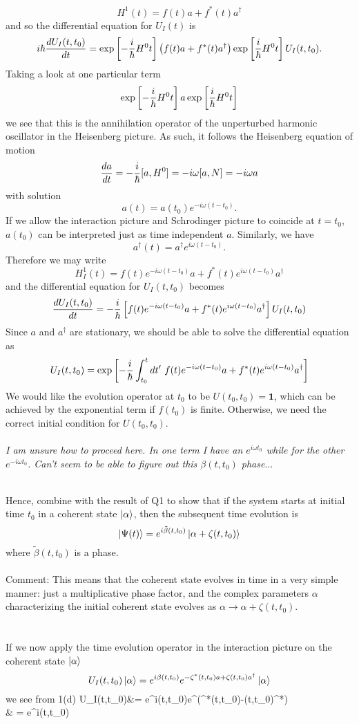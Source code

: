 \documentclass[10pt,letterpaper]{article}
\begin{document}
	\[
		H^1(t) = f(t)a+f^*(t)a^\dag
	\] 
	and so the differential equation for $U_I(t)$ is
	\[
		i\h\diff[U_I(t,t_0)]{t}  = \exp\blr{-\frac{i}{\h}H^0 t}\plr{f(t)a+f^*(t)a^\dag }\exp\blr{\frac{i}{\h}H^0t} U_I(t,t_0).
	\]
	Taking a look at one particular term
	\[
		 \exp\blr{-\frac{i}{\h}H^0t}a\exp\blr{\frac{i}{\h}H^0t} 
	\]
	we see that this is the annihilation operator of the unperturbed harmonic oscillator in the Heisenberg picture. As
	such, it follows the Heisenberg equation of motion
	\[
		\diff[a]{t} = -\frac{i}{\h}[a,H^0] = -i\omega[a,N] = -i\omega a
	\]
	with solution
	\[
		a(t) = a(t_0)e^{-i\omega (t-t_0)}.
	\]
	If we allow the interaction picture and Schrodinger picture to coincide at $t=t_0$, $a(t_0)$ can be 
	interpreted just as time independent $a$. Similarly, we have
	\[
		a^\dag(t) = a^\dag e^{i\omega (t-t_0)}.
	\]
	Therefore we may write
	\[
		H_I^1(t) = f(t)e^{-i\omega (t-t_0)}a+f^*(t)e^{i\omega (t-t_0)}a^\dag
	\]
	and the differential equation for $U_I(t,t_0)$ becomes
	\[
		\diff[U_I(t,t_0)]{t} = -\frac{i}{\h} \blr{f(t)e^{-i\omega (t-t_0)}a+f^*(t)e^{i\omega (t-t_0)}a^\dag} U_I(t,t_0)
	\]
	Since $a$ and $a^\dag$ are stationary, we should be able to solve the differential equation as
	\[
		U_I(t,t_0) = \exp\blr{-\frac{i}{\h}\int_{t_0}^t dt'\ f(t)e^{-i\omega (t-t_0)}a+f^*(t)e^{i\omega (t-t_0)}a^\dag}
	\]
	We would like the evolution operator at $t_0$ to be $U(t_0,t_0) = \mathbf 1$, which can be achieved by the 
	exponential term if $f(t_0)$ is finite. Otherwise, we need the correct initial condition for $U(t_0,t_0)$.
	\\
	\\
	\emph{I am unsure how to proceed here. In one term I have an $e^{i\omega t_0}$ while for the other
	$e^{-i\omega t_0}$. Can't seem to be able to figure out this $\beta(t,t_0)$ phase}...
	\\
	\\
	\item
	Hence, combine with the result of Q1 to show that if the system starts at initial time $t_0$ in a coherent state
	$\ket\alpha$, then the subsequent time evolution is
	\[
		\ket{\Psi(t)} = e^{i\tilde\beta(t,t_0)}\ket{\alpha+\zeta(t,t_0)}
	\]
	where $\tilde\beta(t,t_0)$ is a phase. 
	\\
	\\
	Comment: This means that the coherent state evolves in time in a very simple manner: just a multiplicative phase
	factor, and the complex parameters $\alpha$ characterizing the initial coherent state evolves as 
	$\alpha\to\alpha +\zeta(t,t_0)$. 
	\\
	\\
	\\
	If we now apply the time evolution operator in the interaction picture on the coherent state $\ket\alpha$
	\[
		U_I(t,t_0)\ket\alpha = e^{i\beta(t,t_0)}e^{-\zeta^*(t,t_0)a+\zeta(t,t_0)a^\dag}\ket{\alpha} 
	\]
	we see from 1(d) 
	\ba
		U_I(t,t_0)\ket\alpha &= e^{i\beta(t,t_0)}e^{(\alpha^*\zeta(t,t_0)-\zeta(t,t_0)^*\alpha)}
		\\
		& = e^{i\tilde\beta(t,t_0)}
	\ea
	\eenum
	
\end{document}
